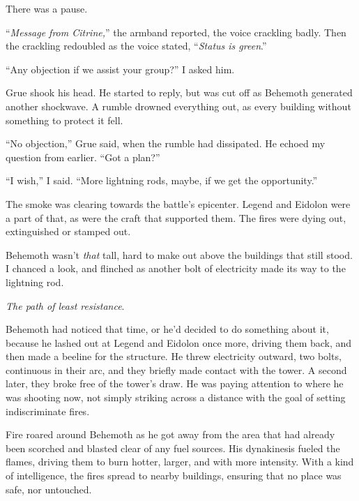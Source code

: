 There was a pause.



``\emph{Message from Citrine,}'' the armband reported, the voice crackling badly.  Then the crackling redoubled as the voice stated, ``\emph{Status is green}.''



``Any objection if we assist your group?'' I asked him.



Grue shook his head.  He started to reply, but was cut off as Behemoth generated another shockwave.  A rumble drowned everything out, as every building without something to protect it fell.



``No objection,'' Grue said, when the rumble had dissipated.  He echoed my question from earlier.  ``Got a plan?''



``I wish,'' I said.  ``More lightning rods, maybe, if we get the opportunity.''



The smoke was clearing towards the battle's epicenter.  Legend and Eidolon were a part of that, as were the craft that supported them.  The fires were dying out, extinguished or stamped out.



Behemoth wasn't \emph{that }tall, hard to make out above the buildings that still stood.  I chanced a look, and flinched as another bolt of electricity made its way to the lightning rod.



\emph{The path of least resistance}.



Behemoth had noticed that time, or he'd decided to do something about it, because he lashed out at Legend and Eidolon once more, driving them back, and then made a beeline for the structure. He threw electricity outward, two bolts, continuous in their arc, and they briefly made contact with the tower.  A second later, they broke free of the tower's draw.  He was paying attention to where he was shooting now, not simply striking across a distance with the goal of setting indiscriminate fires.



Fire roared around Behemoth as he got away from the area that had already been scorched and blasted clear of any fuel sources.  His dynakinesis fueled the flames, driving them to burn hotter, larger, and with more intensity.  With a kind of intelligence, the fires spread to nearby buildings, ensuring that no place was safe, nor untouched.



